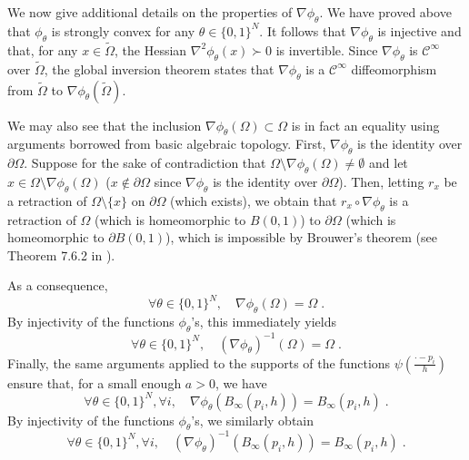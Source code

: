 \documentclass{article}
\theoremstyle{plain}
\theoremstyle{definition}
\theoremstyle{remark}
\newcommand\p[1]{\left( {#1}\right)}
\begin{document}
\begin{itemize}
    We now give additional details on the properties of $\nabla \phi_{\theta}$. 
    We have proved above that $\phi_\theta$ is strongly convex for any $\theta \in \{0,1\}^N$. 
    It follows that $\nabla \phi_{\theta}$ is injective and that, for any $x \in \tilde{\Omega}$, the Hessian $\nabla^2 \phi_{\theta} (x) \succ 0$ is invertible. 
    Since $\nabla \phi_{\theta}$ is $\mathcal{C}^{\infty}$ over $\tilde{\Omega}$, the global inversion theorem states that $\nabla \phi_{\theta}$ is a $\mathcal{C}^{\infty}$ diffeomorphism from $\tilde{\Omega}$ to $\nabla \phi_{\theta}(\tilde{\Omega})$.
    
    
    We may also see that the inclusion $\nabla \phi_{\theta}(\Omega) \subset \Omega$ is in fact an equality using arguments borrowed from basic algebraic topology. 
    First, $\nabla \phi_{\theta}$ is the identity over $\partial \Omega$. 
    Suppose for the sake of contradiction that $\Omega \setminus \nabla \phi_{\theta}(\Omega) \neq \emptyset$ and let $x \in \Omega \setminus \nabla \phi_{\theta}(\Omega)$ ($x\notin \partial \Omega$ since $\nabla \phi_{\theta}$ is the identity over $\partial \Omega$). 
    Then, letting $r_x$ be a retraction of $\Omega \setminus \{ x \}$ on $\partial \Omega$ (which exists), we obtain that $r_x \circ \nabla \phi_{\theta}$ is a retraction of $\Omega$ (which is homeomorphic to $B(0, 1)$) to $\partial \Omega$ (which is homeomorphic to $ \partial B(0, 1)$), which is impossible by Brouwer's theorem (see Theorem 7.6.2 in \cite{randalwilliams2024algebraictopology}).
        
    As a consequence, 
    \begin{equation}
        \forall \theta \in \{0, 1 \}^{N}, \quad \nabla \phi_{\theta}(\Omega) = \Omega \;.
    \end{equation}
    By injectivity of the functions $\phi_\theta$'s, this immediately yields
    \begin{equation}
        \forall \theta \in \{0, 1 \}^{N}, \quad (\nabla \phi_{\theta})^{-1} \p{\Omega} = \Omega \;.
    \end{equation}
    Finally, the same arguments applied to the supports of the functions $\psi \p{\frac{\cdot - p_i}{h}}$ 
 ensure that, for a small enough $a>0$, we have
    \begin{equation}
        \forall \theta \in \{0, 1 \}^{N}, \forall i, \quad \nabla \phi_{\theta} \p{B_{\infty}\p{p_i, h}} = B_{\infty}\p{p_i, h} \;.
    \end{equation}
    By injectivity of the functions $\phi_\theta$'s, we similarly obtain
    \begin{equation}
        \forall \theta \in \{0, 1 \}^{N}, \forall i, \quad (\nabla \phi_{\theta})^{-1} \p{B_{\infty}\p{p_i, h}} = B_{\infty}\p{p_i, h} \;.
    \end{equation}


\end{itemize}
\end{document}
